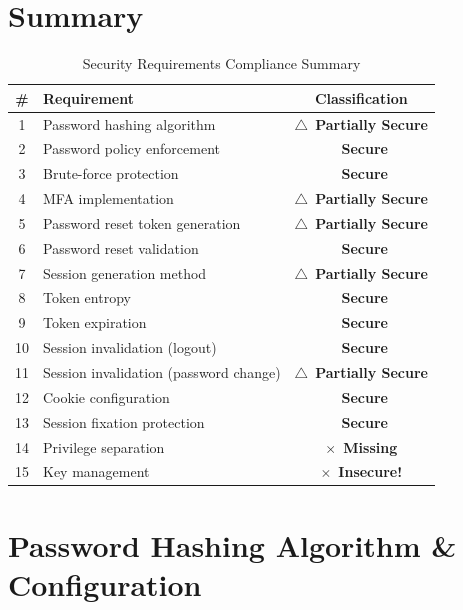 \documentclass[11pt,a4paper]{article}
\newcommand{\secure}{\textcolor{securegreen}{\checkmark~\textbf{Secure}}}
\newcommand{\partiallysecure}{\textcolor{warningorange}{$\triangle$~\textbf{Partially Secure}}}
\newcommand{\insecure}{\textcolor{dangerred}{$\times$~\textbf{Insecure!}}}
\newcommand{\missing}{\textcolor{dangerred}{$\times$~\textbf{Missing}}}
\begin{document}
\tableofcontents
\newpage

\section*{Summary}

\begin{table}[h!]
\centering
\renewcommand{\arraystretch}{1.4}
\begin{tabular}{|c|l|c|}
\hline
\textbf{\#} & \textbf{Requirement} & \textbf{Classification} \\
\hline
1 & Password hashing algorithm & \partiallysecure \\
\hline
2 & Password policy enforcement & \secure \\
\hline
3 & Brute-force protection & \secure \\
\hline
4 & MFA implementation & \partiallysecure \\
\hline
5 & Password reset token generation & \partiallysecure \\
\hline
6 & Password reset validation & \secure \\
\hline
7 & Session generation method & \partiallysecure \\
\hline
8 & Token entropy & \secure \\
\hline
9 & Token expiration & \secure \\
\hline
10 & Session invalidation (logout) & \secure \\
\hline
11 & Session invalidation (password change) & \partiallysecure \\
\hline
12 & Cookie configuration & \secure \\
\hline
13 & Session fixation protection & \secure \\
\hline
14 & Privilege separation & \missing \\
\hline
15 & Key management & \insecure \\
\hline
\end{tabular}
\caption{Security Requirements Compliance Summary}
\end{table}

\newpage

\section{Password Hashing Algorithm \& Configuration}
\end{document}
